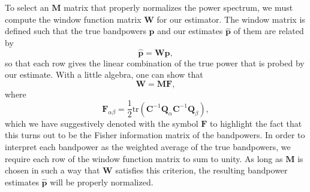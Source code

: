 \documentclass[twocolumn,numberedappendix]{emulateapj} \shorttitle{PSA64}
\begin{document}
To select an $\mathbf{M}$ matrix that properly normalizes the power spectrum, we must compute
the window function matrix $\mathbf{W}$ for our estimator. The window matrix is defined such that
the true bandpowers $\mathbf{p}$ and our estimates $\hat{\mathbf{p}}$ of them are related by
\begin{equation}\label{eqn:true_pspec_2_est_pspec}
\hat{\mathbf{p}} = \mathbf{W} \mathbf{p},
\end{equation}
so that each row gives the linear combination of the true power that is probed by our estimate. With
a little algebra, one can show that 
\begin{equation}\label{eqn:window_def}
    \mathbf{W} = \mathbf{M}\mathbf{F}, 
\end{equation}
where
\begin{equation}
\label{eq:FisherMatrix}
\mathbf{F}_{\alpha\beta} =
\frac{1}{2}\textrm{tr}(\mathbf{C}^{-1}\mathbf{Q}_{\alpha}\mathbf{C}^{-1}\mathbf{Q}_{\beta}),
\end{equation}
which we have suggestively denoted with the symbol $\mathbf{F}$ to highlight the fact that this turns out to be the Fisher
information matrix of the bandpowers. In order to interpret each bandpower as the weighted
average of the true bandpowers, we require each row of the window function matrix to sum to
unity. As long as $\mathbf{M}$ is chosen in such a way that $\mathbf{W}$ satisfies this criterion, the resulting bandpower estimates
$\hat{\mathbf{p}}$ will be properly normalized.

%
\end{document}

